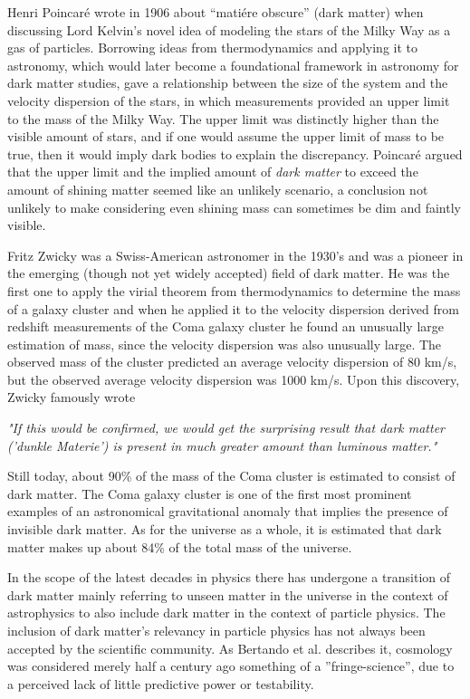 Henri Poincaré wrote in 1906 about “matiére obscure” (dark matter) when discussing Lord Kelvin’s novel idea of modeling the stars of the Milky Way as a gas of particles. Borrowing ideas from thermodynamics and applying it to astronomy, which would later become a foundational framework in astronomy for dark matter studies, gave a relationship between the size of the system and the velocity dispersion of the stars, in which measurements provided an upper limit to the mass of the Milky Way. The upper limit was distinctly higher than the visible amount of stars, and if one would assume the upper limit of mass to be true, then it would imply dark bodies to explain the discrepancy. Poincaré argued that the upper limit and the implied amount of \textit{dark matter} to exceed the amount of shining matter seemed like an unlikely scenario, a conclusion not unlikely to make considering even shining mass can sometimes be dim and faintly visible. \cite{bertone2016-history-dark-matter}

Fritz Zwicky was a Swiss-American astronomer in the 1930's and was a pioneer in the emerging (though not yet widely accepted) field of dark matter. He was the first one to apply the virial theorem from thermodynamics to determine the mass of a galaxy cluster and when he applied it to the velocity dispersion derived from redshift measurements of the Coma galaxy cluster he found an unusually large estimation of mass, since the velocity dispersion was also unusually large. The observed mass of the cluster predicted an average velocity dispersion of 80 km/s, but the observed average velocity dispersion was 1000 km/s. Upon this discovery, Zwicky famously wrote 

\begin{center}
\textit{"If this would be confirmed, we would get the surprising result that dark matter ('dunkle Materie') is present in much greater amount than luminous matter."}
\end{center}

Still today, about 90\% of the mass of the Coma cluster is estimated to consist of dark matter. The Coma galaxy cluster is one of the first most prominent examples of an astronomical gravitational anomaly that implies the presence of invisible dark matter. As for the universe as a whole, it is estimated that dark matter makes up about 84\% of the total mass of the universe. 

In the scope of the latest decades in physics there has undergone a transition of dark matter mainly referring to unseen matter in the universe in the context of astrophysics to also include dark matter in the context of particle physics. The inclusion of dark matter's relevancy in particle physics has not always been accepted by the scientific community. As Bertando et al. describes it, cosmology was considered merely half a century ago something of a ''fringe-science'', due to a perceived lack of little predictive power or testability. 

